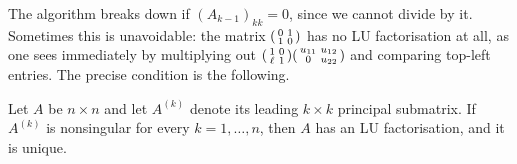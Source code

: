 The algorithm breaks down if $(A_{k-1})_{kk} = 0$, since we cannot divide by it. Sometimes this is unavoidable: the matrix $\begin{psmallmatrix}0&1\\1&0\end{psmallmatrix}$ has no LU factorisation at all, as one sees immediately by multiplying out $\begin{psmallmatrix}1&0\\ \ell&1\end{psmallmatrix}\begin{psmallmatrix}u_{11}&u_{12}\\0&u_{22}\end{psmallmatrix}$ and comparing top-left entries. The precise condition is the following.

\begin{theorem}\label{thm:luexist}
  Let $A$ be $n\times n$ and let $A^{(k)}$ denote its leading $k\times k$ principal submatrix. If $A^{(k)}$ is nonsingular for every $k = 1, \dots, n$, then $A$ has an LU factorisation, and it is unique.
\end{theorem}
